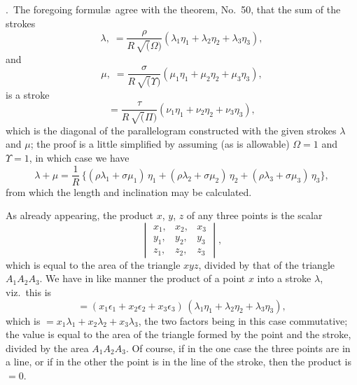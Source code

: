 \documentclass[12pt,a4paper]{article}
\theoremstyle{definition}
\begin{document}
.\ The foregoing formul\ae\ agree with the theorem, No.~50, that the sum of the strokes
\[
\lambda, \;= \frac{\rho}{R\, \surd(\Omega)}
(\lambda_1 \eta_1 + \lambda_2 \eta_2 + \lambda_3 \eta_3),
\]
and
\[
\mu, \;= \frac{\sigma}{R\, \surd(\Upsilon)}
(\mu_1 \eta_1 + \mu_2 \eta_2 + \mu_3 \eta_3),
\]
is a stroke
\[
= \frac{\tau}{R\, \surd(\Pi)}
(\nu_1 \eta_1 + \nu_2 \eta_2 + \nu_3 \eta_3),
\]
which is the diagonal of the parallelogram constructed with the given strokes $\lambda$ and $\mu$;
the proof is a little simplified by assuming (as is allowable) $\Omega = 1$ and $\Upsilon = 1$,
in which case we have
\[
\lambda + \mu = \frac{1}{R}\,
\{(\rho \lambda_1 + \sigma \mu_1)\, \eta_1
+ (\rho \lambda_2 + \sigma \mu_2)\, \eta_2
+ (\rho \lambda_3 + \sigma \mu_3)\, \eta_3\},
\]
from which the length and inclination may be calculated.

As already appearing, the product $x$, $y$, $z$ of any three points is the scalar
\[
\begin{vmatrix}
x_1, & x_2, & x_3 \\
y_1, & y_2, & y_3 \\
z_1, & z_2, & z_3
\end{vmatrix},
\]
which is equal to the area of the triangle $xyz$, divided by that of the triangle $A_1 A_2 A_3$.
We have in like manner the product of a point $x$ into a stroke $\lambda$, viz.\ this is
\[
= (x_1 \epsilon_1 + x_2 \epsilon_2 + x_3 \epsilon_3)\,
(\lambda_1 \eta_1 + \lambda_2 \eta_2 + \lambda_3 \eta_3),
\]
which is $= x_1 \lambda_1 + x_2 \lambda_2 + x_3 \lambda_3$, the two factors being in this case commutative;
the value is equal to the area of the triangle formed by the point and the stroke, divided by
the area $A_1 A_2 A_3$. Of course, if in the one case the three points are in a line, or if in
the other the point is in the line of the stroke, then the product is $= 0$.
\end{document}
